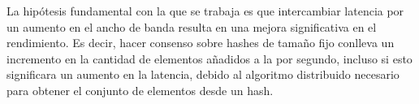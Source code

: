 La hipótesis fundamental con la que se trabaja es que intercambiar latencia por un aumento en el
ancho de banda resulta en una mejora significativa en el rendimiento.
%
Es decir, hacer consenso sobre hashes de tamaño fijo conlleva un incremento en la cantidad de elementos
añadidos a la \setchain por segundo, incluso si esto significara un aumento en la latencia,
debido al algoritmo distribuido necesario para obtener el conjunto de elementos desde un hash.




